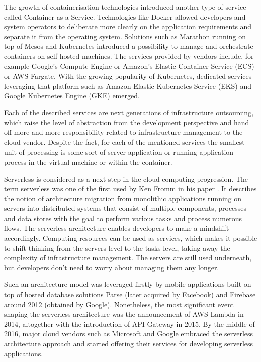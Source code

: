 The growth of containerisation technologies introduced another type of service called Container as a Service. Technologies like Docker allowed developers and system operators to deliberate more clearly on the application requirements and separate it from the operating system. Solutions such as Marathon running on top of Mesos and Kubernetes introduced a possibility to manage and orchestrate containers on self-hosted machines. The services provided by vendors include, for example Google's Compute Engine or Amazon's Elastic Container Service (ECS) or AWS Fargate. With the growing popularity of Kubernetes, dedicated services leveraging that platform such as Amazon Elastic Kubernetes Service (EKS) and Google Kubernetes Engine (GKE) emerged.

Each of the described services are next generations of infrastructure outsourcing, which raise the level of abstraction from the development perspective and hand off more and more responsibility related to infrastructure management to the cloud vendor. Despite the fact, for each of the mentioned services the smallest unit of processing is some sort of server application or running application process in the virtual machine or within the container.

Serverless is considered as a next step in the cloud computing progression. 
The term serverless was one of the first used by Ken Fromm in his paper \cite{KenFromm}. It describes the notion of architecture migration from monolithic applications running on servers into distributed systems that consist of multiple components, processes and data stores with the goal to perform various tasks and process numerous flows. The serverless architecture enables developers to make a mindshift accordingly. Computing resources can be used as services, which makes it possible to shift thinking from the servers level to the tasks level, taking away the complexity of infrastructure management. The servers are still used underneath, but developers don't need to worry about managing them any longer.

Such an architecture model was leveraged firstly by mobile applications built on top of hosted database solutions Parse (later acquired by Facebook) and Firebase around 2012 (obtained by Google). Nonetheless, the most significant event shaping the serverless architecture was the announcement of AWS Lambda in 2014, altogether with the introduction of API Gateway in 2015. By the middle of 2016, major cloud vendors such as Microsoft and Google embraced the serverless architecture approach and started offering their services for developing serverless applications.

